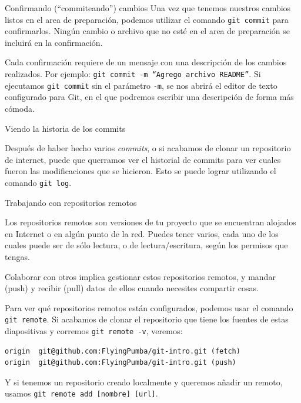 \documentclass{beamer}
\begin{document}
\begin{frame}{Confirmando (``commiteando'') cambios}
    Una vez que tenemos nuestros cambios listos en el area de preparación, podemos
    utilizar el comando \texttt{git commit} para confirmarlos. Ningún cambio o archivo
    que no esté en el area de preparación se incluirá en la confirmación.

    \vspace{1em}

    Cada confirmación requiere de un mensaje con una descripción de los cambios realizados.
    Por ejemplo: \texttt{git commit -m ``Agrego archivo README''}. Si ejecutamos
    \texttt{git commit} sin el parámetro \texttt{-m}, se nos abrirá el editor de texto configurado para Git,
    en el que podremos escribir una descripción de forma más cómoda.

\end{frame}

\begin{frame}{Viendo la historia de los commits}

    Después de haber hecho varios \textit{commits}, o si acabamos de clonar un repositorio
    de internet, puede que querramos ver el historial de commits para ver cuales
    fueron las modificaciones que se hicieron. Esto se puede lograr utilizando el
    comando \texttt{git log}.

\end{frame}

\begin{frame}[fragile]{Trabajando con repositorios remotos}

    Los repositorios remotos son versiones de tu proyecto que se encuentran alojados
    en Internet o en algún punto de la red. Puedes tener varios, cada uno de los cuales
    puede ser de sólo lectura, o de lectura/escritura, según los permisos que tengas.

    \vspace{0.5em}

    Colaborar con otros implica gestionar estos repositorios remotos, y mandar (push) y recibir (pull)
    datos de ellos cuando necesites compartir cosas.

    \vspace{0.5em}

    Para ver qué repositorios remotos están configurados, podemos usar el comando \texttt{git remote}.
    Si acabamos de clonar el repositorio que tiene los fuentes de estas diapositivas y corremos \texttt{git remote -v}, veremos:
    \begin{verbatim}
origin  git@github.com:FlyingPumba/git-intro.git (fetch)
origin  git@github.com:FlyingPumba/git-intro.git (push)
    \end{verbatim}

    Y si tenemos un repositorio creado localmente y queremos añadir un remoto, usamos \texttt{git remote add [nombre] [url]}.

\end{frame}
\end{document}
